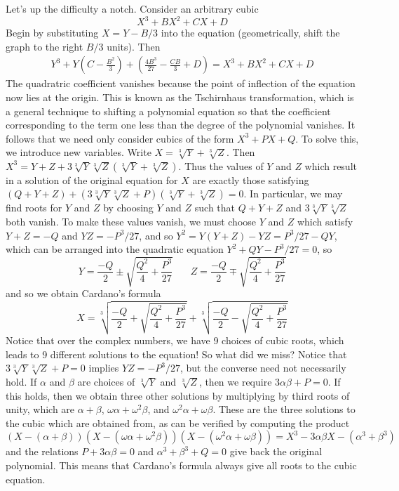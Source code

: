 Let's up the difficulty a notch. Consider an arbitrary cubic
%
\[ X^3 + BX^2 + CX + D \]
%
Begin by substituting $X = Y - B/3$ into the equation (geometrically, shift the graph to the right $B/3$ units). Then
%
\begin{align*}
   Y^3 + Y\left(C - \frac{B^2}{3}\right) + \left( \frac{4B^3}{27} - \frac{CB}{3} + D \right) = X^3 + BX^2 + CX + D
\end{align*}
%
The quadratric coefficient vanishes because the point of inflection of the equation now lies at the origin. This is known as the Tschirnhaus transformation, which is a general technique to shifting a polynomial equation so that the coefficient corresponding to the term one less than the degree of the polynomial vanishes. It follows that we need only consider cubics of the form $X^3 + PX + Q$. To solve this, we introduce new variables. Write $X = \sqrt[3]{Y} + \sqrt[3]{Z}$. Then $X^3 = Y + Z + 3\sqrt[3]{Y}\sqrt[3]{Z}(\sqrt[3]{Y} + \sqrt[3]{Z})$. Thus the values of $Y$ and $Z$ which result in a solution of the original equation for $X$ are exactly those satisfying $(Q + Y + Z) + (3\sqrt[3]{Y}\sqrt[3]{Z} + P)(\sqrt[3]{Y} + \sqrt[3]{Z}) = 0$. In particular, we may find roots for $Y$ and $Z$ by choosing $Y$ and $Z$ such that $Q + Y + Z$ and $3 \sqrt[3]{Y} \sqrt[3]{Z}$ both vanish. To make these values vanish, we must choose $Y$ and $Z$ which satisfy $Y + Z = -Q$ and $YZ = -P^3/27$, and so $Y^2 = Y(Y + Z) - YZ = P^3/27 - QY$, which can be arranged into the quadratic equation $Y^2 + QY - P^3/27 = 0$, so
%
\[ Y = \frac{-Q}{2} \pm \sqrt{\frac{Q^2}{4} + \frac{P^3}{27}}\ \ \ \ \ \ \ \ Z = \frac{-Q}{2} \mp \sqrt{\frac{Q^2}{4} + \frac{P^3}{27}} \]
%
and so we obtain Cardano's formula
%
\[ X = \sqrt[3]{\frac{-Q}{2} + \sqrt{\frac{Q^2}{4} + \frac{P^3}{27}}} + \sqrt[3]{\frac{-Q}{2} - \sqrt{\frac{Q^2}{4} + \frac{P^3}{27}}} \]
%
Notice that over the complex numbers, we have 9 choices of cubic roots, which leads to 9 different solutions to the equation! So what did we miss? Notice that $3\sqrt[3]{Y}\sqrt[3]{Z} + P = 0$ implies $YZ = -P^3/27$, but the converse need not necessarily hold. If $\alpha$ and $\beta$ are choices of $\sqrt[3]{Y}$ and $\sqrt[3]{Z}$, then we require $3\alpha\beta + P = 0$. If this holds, then we obtain three other solutions by multiplying by third roots of unity, which are $\alpha + \beta$, $\omega \alpha + \omega^2 \beta$, and $\omega^2 \alpha + \omega \beta$. These are the three solutions to the cubic which are obtained from, as can be verified by computing the product
%
\[ (X - (\alpha + \beta))(X - (\omega \alpha + \omega^2 \beta)) (X - (\omega^2 \alpha + \omega \beta)) = X^3 - 3\alpha \beta X - (\alpha^3 + \beta^3) \]
%
and the relations $P + 3 \alpha \beta = 0$ and $\alpha^3 + \beta^3 + Q = 0$ give back the original polynomial. This means that Cardano's formula always give all roots to the cubic equation.


